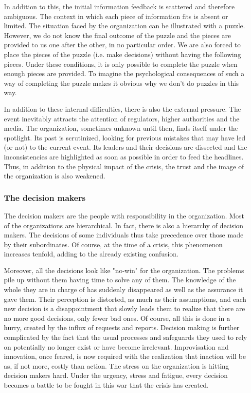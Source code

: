 In addition to this, the initial information feedback is scattered and therefore ambiguous.
The context in which each piece of information fits is absent or limited.
The situation faced by the organization can be illustrated with a puzzle.
However, we do not know the final outcome of the puzzle and the pieces are provided to us one after the other, in no particular order.
We are also forced to place the pieces of the puzzle (i.e. make decisions) without having the following pieces.
Under these conditions, it is only possible to complete the puzzle when enough pieces are provided.
To imagine the psychological consequences of such a way of completing the puzzle makes it obvious why we don't do puzzles in this way.

In addition to these internal difficulties, there is also the external pressure.
The event inevitably attracts the attention of regulators, higher authorities and the media.
The organization, sometimes unknown until then, finds itself under the spotlight.
Its past is scrutinized, looking for previous mistakes that may have led (or not) to the current event.
Its leaders and their decisions are dissected and the inconsistencies are highlighted as soon as possible in order to feed the headlines.
Thus, in addition to the physical impact of the crisis, the trust and the image of the organization is also weakened.

\subsubsection{The decision makers}
The decision makers are the people with responsibility in the organization.
Most of the organizations are hierarchical.
In fact, there is also a hierarchy of decision makers.
The decisions of some individuals thus take precedence over those made by their subordinates.
Of course, at the time of a crisis, this phenomenon increases tenfold, adding to the already existing confusion.

Moreover, all the decisions look like "no-win" for the organization.
The problems pile up without them having time to solve any of them.
The knowledge of the whole they are in charge of has suddenly disappeared as well as the assurance it gave them.
Their perception is distorted, as much as their assumptions, and each new decision is a disappointment that slowly leads them to realize that there are no more good decisions, only fewer bad ones.
Of course, all this is done in a hurry, created by the influx of requests and reports.
Decision making is further complicated by the fact that the usual processes and safeguards they used to rely on potentially no longer exist or have become irrelevant.
Improvisation and innovation, once feared, is now required with the realization that inaction will be as, if not more, costly than action.
The stress on the organization is hitting decision makers hard.
Under the urgency, stress and fatigue, every decision becomes a battle to be fought in this war that the crisis has created.

